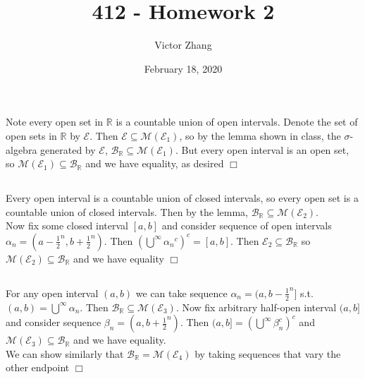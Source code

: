 \documentclass{article}
\title{412 - Homework 2}
\author{Victor Zhang }
\date{February 18, 2020}
\begin{document}
\maketitle

\section{}
\subsection{}
Note every open set in $\mathbb{R}$ is a countable union of open intervals. Denote the set of open sets in $\mathbb{R}$ by $\mathcal{E}$. Then $\mathcal{E} \subseteq \mathcal{M}(\mathcal{E}_1)$, so by the lemma shown in class, the $\sigma$-algebra generated by $\mathcal{E}$, $\mathcal{B}_{\mathbb{R}} \subseteq \mathcal{M}(\mathcal{E}_1)$. But every open interval is an open set, so $\mathcal{M}(\mathcal{E}_1) \subseteq \mathcal{B}_\mathbb{R}$ and we have equality, as desired $\Box$
\subsection{}
Every open interval is a countable union of closed intervals, so every open set is a countable union of closed intervals. Then by the lemma, $\mathcal{B}_\mathbb{R} \subseteq \mathcal{M}(\mathcal{E}_2)$.\\
Now fix some closed interval $[a,b]$ and consider sequence of open intervals $\alpha_n = (a-{\frac{1}{2}}^n,b+{\frac{1}{2}}^n)$. Then $\left(\bigcup\limits^{\infty}{\alpha_n}^c\right)^c = [a,b]$. Then $\mathcal{E}_2 \subseteq \mathcal{B}_\mathbb{R}$ so $\mathcal{M}(\mathcal{E}_2) \subseteq \mathcal{B}_\mathbb{R}$ and we have equality $\Box$
\subsection{}
For any open interval $(a,b)$ we can take sequence $\alpha_n = (a,b-{\frac{1}{2}}^n]$ s.t. $(a,b) = \bigcup\limits^\infty \alpha_n$. Then $\mathcal{B}_\mathbb{R} \subseteq \mathcal{M}(\mathcal{E}_3)$. Now fix arbitrary half-open interval $(a,b]$ and consider sequence $\beta_n = (a,b+{\frac{1}{2}}^n)$. Then $(a,b] = \left(\bigcup\limits^\infty \beta_n^c\right)^c$ and $\mathcal{M}(\mathcal{E}_3) \subseteq \mathcal{B}_\mathbb{R}$ and we have equality.\\
We can show similarly that $\mathcal{B}_\mathbb{R} = \mathcal{M}(\mathcal{E}_4)$ by taking sequences that vary the other endpoint $\Box$
\end{document}
